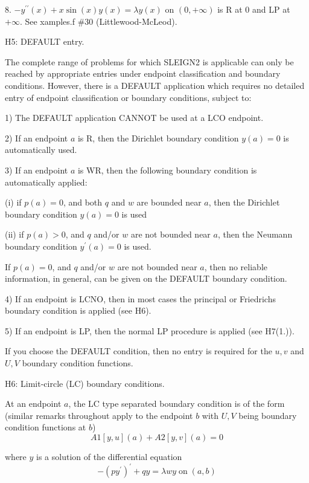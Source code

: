 \documentclass[12pt]{amsart}%
\theoremstyle{plain}
\numberwithin{equation}{section}
\numberwithin{theorem}{section}
\begin{document}
8. $-y^{\prime\prime}(x)+x\sin(x)y(x)=\lambda y(x)$ on $(0,+\infty)$ is R at
$0$ and LP at $+\infty.$ See xamples.f \#30 (Littlewood-McLeod).

\medskip

H5: DEFAULT entry.

The complete range of problems for which SLEIGN2 is applicable can only be
reached by appropriate entries under endpoint classification and boundary
conditions. However, there is a DEFAULT application which requires no detailed
entry of endpoint classification or boundary conditions, subject to:

1) The DEFAULT application CANNOT be used at a LCO endpoint.

2) If an endpoint $a$ is R, then the Dirichlet boundary condition $y(a)=0$ is
automatically used.

3) If an endpoint $a$ is WR, then the following boundary condition is
automatically applied:

(i) if $p(a)=0$, and both $q$ and $w$ are bounded near $a$, then the Dirichlet
boundary condition $y(a)=0$ is used

(ii) if $p(a)>0$, and $q$ and/or $w$ are not bounded near $a$, then the
Neumann boundary condition $y^{\prime}(a)=0$ is used.

If $p(a)=0$, and $q$ and/or $w$ are not bounded near $a$, then no reliable
information, in general, can be given on the DEFAULT boundary condition.

4) If an endpoint is LCNO, then in most cases the principal or Friedrichs
boundary condition is applied (see H6).

5) If an endpoint is LP, then the normal LP procedure is applied (see H7(1.)).

If you choose the DEFAULT condition, then no entry is required for the $u,v$
and $U,V$ boundary condition functions.

\medskip

H6: Limit-circle (LC) boundary conditions.

At an endpoint $a$, the LC type separated boundary condition is of the form
(similar remarks throughout apply to the endpoint $b$ with $U,V$ being
boundary condition functions at $b$)%
\begin{equation}
A1[y,u](a)+A2[y,v](a)=0 \tag{**}%
\end{equation}

\noindent where $y$ is a solution of the differential equation%
\begin{equation}
-(py^{\prime})^{\prime}+qy=\lambda wy\;\text{on}\;(a,b) \tag{*}%
\end{equation}
\end{document}
